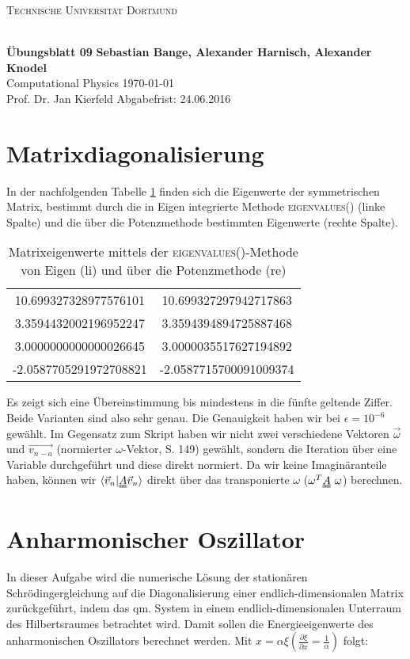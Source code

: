 
\usepackage{verbatim}
\usepackage{ulem}
\usepackage{braket}
\newcommand\OverfullCenter[1]{\noindent\makebox[\linewidth]{#1}}

\noindent
\centerline{\small{\textsc{Technische Universität Dortmund}}} \\
\large\textbf{Übungsblatt 09} \hfill \footnotesize\textbf{Sebastian Bange, Alexander Harnisch, Alexander Knodel} \\
\normalsize Computational Physics \hfill \today \\
Prof. Dr. Jan Kierfeld \hfill Abgabefrist: 24.06.2016\\
\noindent\makebox[\linewidth]{\rule{\textwidth}{0.4pt}}
\section*{Matrixdiagonalisierung}
In der nachfolgenden Tabelle \ref{table:1aeigenvalues} finden sich die Eigenwerte der symmetrischen Matrix, bestimmt durch die in Eigen integrierte Methode \textsc{eigenvalues()} (linke Spalte) und die über die Potenzmethode bestimmten Eigenwerte (rechte Spalte).
\begin{table}[]
\centering
\caption{Matrixeigenwerte mittels der \textsc{eigenvalues()}-Methode von Eigen (li) und über die Potenzmethode (re)}
\label{table:1aeigenvalues}
\begin{tabular}{cc}
10.699327328977576101  & 10.699327297942717863   \\
3.3594432002196952247  & 3.3594394894725887468   \\
3.0000000000000026645  & 3.0000035517627194892    \\
-2.0587705291972708821 & -2.0587715700091009374 \\
\end{tabular}
\end{table}
Es zeigt sich eine Übereinstimmung bis mindestens in die fünfte geltende Ziffer. Beide Varianten sind also sehr genau. Die Genauigkeit haben wir bei $\epsilon = 10^{-6}$ gewählt. Im Gegensatz zum Skript haben wir nicht zwei verschiedene Vektoren $\vec{\omega}$ und $\vec{v_{n-a}}$ (normierter $\omega$-Vektor, S. 149) gewählt, sondern die Iteration über eine Variable durchgeführt und diese direkt normiert. Da wir keine Imaginäranteile haben, können wir $\braket{\vec{v}_n | \uuline{A}\vec{v}_n}$ direkt über das transponierte $\omega$ ($\omega^T \uuline{A}\,\,\omega$) berechnen.

\section*{Anharmonischer Oszillator}
In dieser Aufgabe wird die numerische Lösung der stationären Schrödingergleichung auf die Diagonalisierung einer endlich-dimensionalen Matrix zurückgeführt, indem das qm. System in einem endlich-dimensionalen Unterraum des Hilbertsraumes betrachtet wird. Damit sollen die Energieeigenwerte des anharmonischen Oszillators berechnet werden.
Mit $x = \alpha \xi \left( \frac{\partial \xi}{\partial x} = \frac{1}{\alpha}\right)$ folgt:

